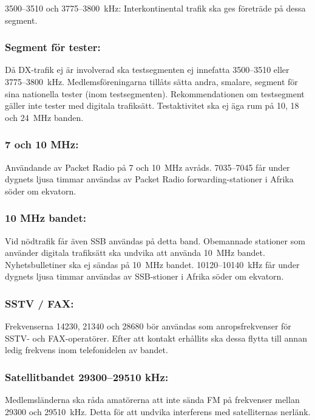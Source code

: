3500--3510 och 3775--3800~kHz:
Interkontinental trafik ska ges företräde på dessa segment.

\subsubsection{Segment för tester:}

Då DX-trafik ej är involverad ska testsegmenten ej innefatta
3500--3510 eller 3775--3800~kHz. Medlemsföreningarna tillåts
sätta andra, smalare, segment för sina nationella tester
(inom testsegmenten).
Rekommendationen om testsegment gäller inte tester med digitala trafiksätt.
Testaktivitet ska ej äga rum på 10, 18 och 24~MHz banden.

\subsubsection{7 och 10 MHz:}

Användande av Packet Radio på 7 och 10~MHz avråds.
7035--7045 får under dygnets ljusa timmar användas av
Packet Radio forwarding-stationer i Afrika söder om
ekvatorn.

\subsubsection{10 MHz bandet:}

Vid nödtrafik får även SSB användas på detta band.
Obemannade stationer som använder digitala trafiksätt ska undvika att
använda 10~MHz bandet.
Nyhetsbulletiner ska ej sändas på 10~MHz bandet.
10120--10140~kHz får under dygnets ljusa timmar användas av
SSB-stioner i Afrika söder om ekvatorn.

\subsubsection{SSTV / FAX:}

Frekvenserna 14230, 21340 och 28680 bör användas
som anropsfrekvenser för SSTV- och FAX-operatörer.
Efter att kontakt erhållits ska dessa flytta till annan
ledig frekvens inom telefonidelen av bandet.

\subsubsection{Satellitbandet 29300--29510 kHz:}

Medlemsländerna ska råda amatörerna att inte sända
FM på frekvenser mellan 29300 och 29510~kHz. Detta
för att undvika interferens med satelliternas nerlänk.


